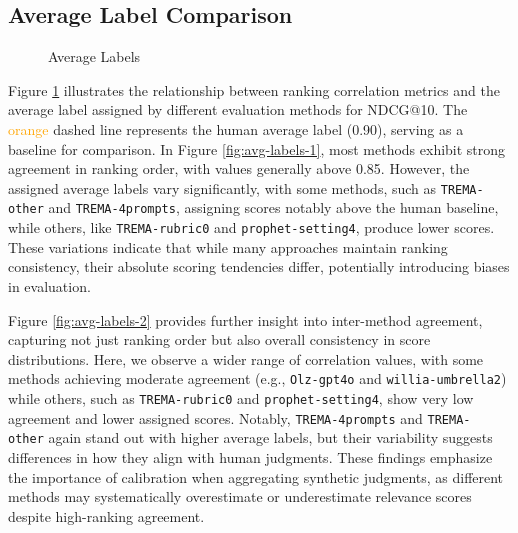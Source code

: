 \subsection{Average Label Comparison}

\begin{figure}
    \centering
    \caption{Average Labels}%
    \label{fig:avg-labels}%
\end{figure}

Figure \ref{fig:avg-labels} illustrates the relationship between ranking correlation metrics and the average label assigned by different evaluation methods for NDCG@10. The \textcolor{orange}{orange} dashed line represents the human average label (0.90), serving as a baseline for comparison. In Figure \ref{fig:avg-labels-1}, most methods exhibit strong agreement in ranking order, with values generally above 0.85. However, the assigned average labels vary significantly, with some methods, such as \texttt{TREMA-other} and \texttt{TREMA-4prompts}, assigning scores notably above the human baseline, while others, like \texttt{TREMA-rubric0} and \texttt{prophet-setting4}, produce lower scores. These variations indicate that while many approaches maintain ranking consistency, their absolute scoring tendencies differ, potentially introducing biases in evaluation.

Figure \ref{fig:avg-labels-2} provides further insight into inter-method agreement, capturing not just ranking order but also overall consistency in score distributions. Here, we observe a wider range of correlation values, with some methods achieving moderate agreement (e.g., \texttt{Olz-gpt4o} and \texttt{willia-umbrella2}) while others, such as \texttt{TREMA-rubric0} and \texttt{prophet-setting4}, show very low agreement and lower assigned scores. Notably, \texttt{TREMA-4prompts} and \texttt{TREMA-\\other} again stand out with higher average labels, but their variability suggests differences in how they align with human judgments. These findings emphasize the importance of calibration when aggregating synthetic judgments, as different methods may systematically overestimate or underestimate relevance scores despite high-ranking agreement.

